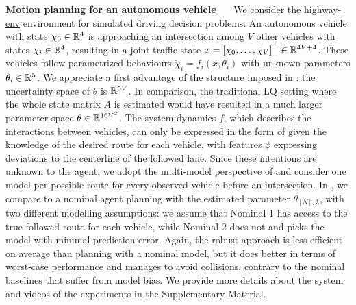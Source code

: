 \documentclass{article}
\begin{document}
\textbf{Motion planning for an autonomous vehicle}~~~
We consider the \href{https://github.com/eleurent/highway-env}{highway-env} environment \citep{highway-env} for simulated driving decision problems. An autonomous vehicle with state $\chi_0\in\mathbb{R}^4$ is approaching an intersection among $V$ other vehicles with states $\chi_i\in\mathbb{R}^4$, resulting in a joint traffic state $x = [\chi_0, \dots,\chi_V]^\top\in\mathbb{R}^{4V+4}$. These vehicles follow parametrized behaviours $\dot{\chi}_i=f_i(x,\theta_i)$ with unknown parameters $\theta_i\in\mathbb{R}^5$. We appreciate a first advantage of the structure imposed in : the uncertainty space of $\theta$ is $\mathbb{R}^{5V}$. In comparison, the traditional LQ setting where the whole state matrix $A$ is estimated would have resulted in a much larger parameter space $\theta\in\mathbb{R}^{16V^2}$.
The system dynamics $f$, which describes the interactions between vehicles, can only be expressed in the form of  given the knowledge of the desired route for each vehicle, with features $\phi$ expressing deviations to the centerline of the followed lane. Since these intentions are unknown to the agent, we adopt the multi-model perspective of  and consider one model per possible route for every observed vehicle before an intersection. In , we compare  to a nominal agent planning with the estimated parameter $\theta_{[N],\lambda}$, with two different modelling assumptions: we assume that Nominal 1 has access to the true followed route for each vehicle, while Nominal 2 does not and picks the model with minimal prediction error. Again, the robust approach is less efficient on average than planning with a nominal model, but it does better in terms of worst-case performance and manages to avoid collisions, contrary to the nominal baselines that suffer from model bias. We provide more details about the system and videos of the experiments in the Supplementary Material.

%
\end{document}
